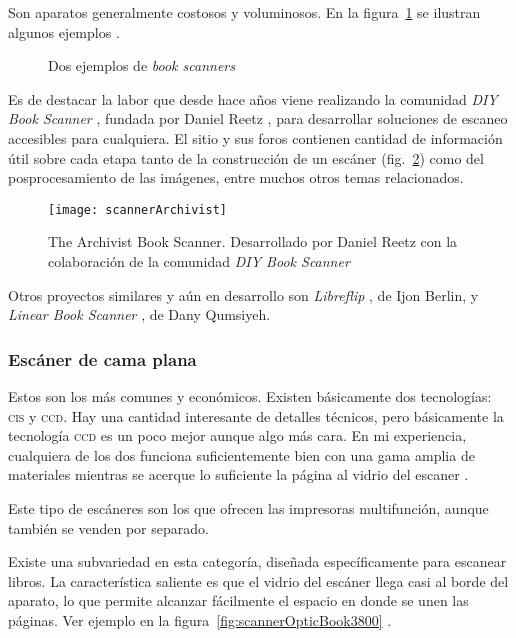 \documentclass[%
	a5paper,
	10pt,
	twoside,
	openright,
	final,
]{memoir}
\begin{document}
{	Son aparatos generalmente costosos y voluminosos. En la figura~\ref{fig:scannerbookScanners} se ilustran algunos ejemplos \cite{ScanSnap, ET16}.
	\begin{figure}
		\hfill
		\caption{Dos ejemplos de \emph{book scanners}\label{fig:scannerbookScanners}}
	\end{figure}

	Es de destacar la labor que desde hace años viene realizando la comunidad \emph{DIY Book Scanner} \cite{DIYBookScanner}, fundada por Daniel Reetz \cite{danreetz}, para desarrollar soluciones de escaneo accesibles para cualquiera. El sitio y sus foros contienen cantidad de información útil sobre cada etapa tanto de la construcción de un escáner (fig.~\ref{fig:scannerArchivist}) como del posprocesamiento de las imágenes, entre muchos otros temas relacionados.

	\begin{figure}
		\centering
		\texttt{[image: scannerArchivist]}
		\caption[The Archivist Book Scanner]{The Archivist Book Scanner. Desarrollado por Daniel Reetz con la colaboración de la comunidad \emph{DIY Book Scanner}\label{fig:scannerArchivist}}
	\end{figure}

	Otros proyectos similares y aún en desarrollo son \emph{Libreflip} \cite{Libreflip}, de Ijon Berlin, y \emph{Linear Book Scanner} \cite{LinearBookScanner}, de Dany Qumsiyeh.

	\subsubsection{Escáner de cama plana} Estos son los más comunes y económicos. Existen básicamente dos tecnologías: \textsc{cis} y \textsc{ccd}. Hay una cantidad interesante de detalles técnicos, pero básicamente la tecnología \textsc{ccd} es un poco mejor aunque algo más cara. En mi experiencia, cualquiera de los dos funciona suficientemente bien con una gama amplia de materiales mientras se acerque lo suficiente la página al vidrio del escaner \cite{CCDvsCIS}.

	Este tipo de escáneres son los que ofrecen las impresoras multifunción, aunque también se venden por separado.

	Existe una subvariedad en esta categoría, diseñada específicamente para escanear libros. La característica saliente es que el vidrio del escáner llega casi al borde del aparato, lo que permite alcanzar fácilmente el espacio en donde se unen las páginas. Ver ejemplo en la figura~\ref{fig:scannerOpticBook3800} \cite{OpticBook3800}.

}
\end{document}
